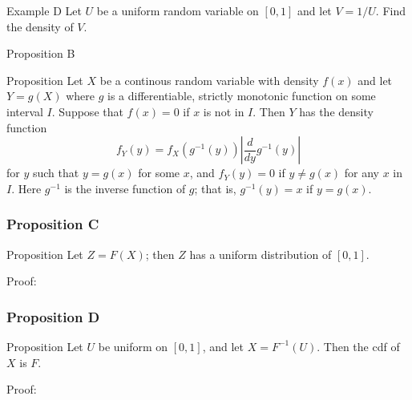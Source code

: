 \documentclass{beamer}
\begin{document}
\begin{frame}{Example D}
Let \(U\) be a uniform random variable on \([0,1]\) and let \(V=1/U\). Find the density of \(V\). 
\end{frame}


\begin{frame}{Proposition B}
    \begin{block}{Proposition}
        Let \(X\) be a continous random variable with density \(f(x)\) and let \(Y=g(X)\) where \(g\) is a differentiable, strictly monotonic function on some interval \(I\). Suppose that \(f(x)=0\) if \(x\) is not in \(I\). Then \(Y\) has the density function \[
        f_Y(y) = f_X(g^{-1}(y))\left|\dfrac{d}{dy}g^{-1}(y)\right|
        \] for \(y\) such that \(y=g(x)\) for some \(x\), and \(f_Y(y)=0\) if \(y \ne g(x)\) for any \(x\) in \(I\). Here \(g^{-1}\) is the inverse function of \(g\); that is, \(g^{-1}(y)=x\) if \(y=g(x)\). 
    \end{block}
    
\end{frame}

\begin{frame}
    \frametitle{Proposition C}
    \begin{block}{Proposition}
        Let \(Z=F(X)\); then \(Z\) has a uniform distribution of \([0,1]\).
    \end{block}
    \begin{block}{Proof:}
        
    \end{block}


    

\end{frame}

\begin{frame}
    \frametitle{Proposition D}

    \begin{block}{Proposition}
        Let \(U\) be uniform on \([0,1]\), and let \(X = F^{-1}(U)\). Then the cdf of \(X\) is \(F\). 
    \end{block}
    \begin{block}{Proof:}
        
    \end{block}

\end{frame}
\end{document}
